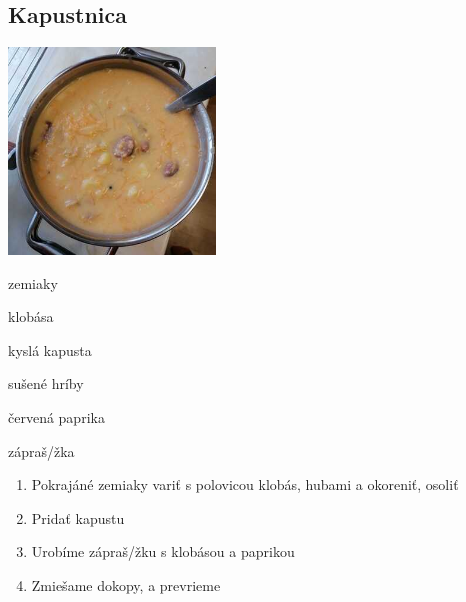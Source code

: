 \setcounter{step}{0}
\subsection{Kapustnica}

\begin{ingredient}
\includegraphics[height=5.5cm]{images/kapustnica}
\def\portions{4}%

\begin{main}
	\item zemiaky
	\item klobása
	\item kyslá kapusta
	\item sušené hríby
	\item červená paprika
	\item zápraš/žka
\end{main}
\end{ingredient}
\begin{recipe}

\begin{enumerate}

\item{Pokrajáné zemiaky variť s polovicou klobás, hubami a okoreniť, osoliť}
\item{Pridať kapustu}
\item{Urobíme zápraš/žku s klobásou a paprikou}
\item{Zmiešame dokopy, a prevrieme}

\end{enumerate}
\end{recipe}

\begin{notes}

\end{notes}
\clearpage	

